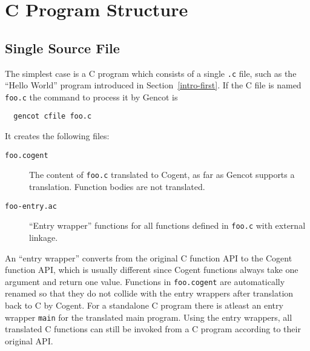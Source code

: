\documentclass[a4paper]{report}
\newcommand{\code}[1]{\textnormal{\texttt{#1}}}
\begin{document}
\chapter{C Program Structure}
\label{struct}

\section{Single Source File}
\label{struct-single}

The simplest case is a C program which consists of a single \code{.c} file, such as the ``Hello World'' program
introduced in Section~\ref{intro-first}. If the C file is named \code{foo.c} the command to process it by Gencot is
\begin{verbatim}
  gencot cfile foo.c
\end{verbatim}
It creates the following files:
\begin{description}
\item[\code{foo.cogent}] The content of \code{foo.c} translated to Cogent, as far as Gencot supports a translation.
Function bodies are not translated.
\item[\code{foo-entry.ac}] ``Entry wrapper'' functions for all functions defined in \code{foo.c} 
with external linkage.
\end{description}

An ``entry wrapper'' converts from the original C function API to the Cogent function API, which is usually different 
since Cogent functions always take one argument and return one value. Functions in \code{foo.cogent} are automatically
renamed so that they do not collide with the entry wrappers after translation back to C by Cogent. For a standalone
C program there is atleast an entry wrapper \code{main} for the translated main program. Using the entry wrappers, all
translated C functions can still be invoked from a C program according to their original API.
\end{document}
